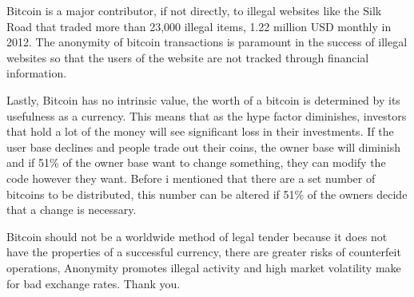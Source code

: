 \documentclass[12pt]{article}
\begin{document}
	Bitcoin is a major contributor, if not directly, to illegal websites like the
	Silk Road that traded more than 23,000 illegal items, 1.22 million USD monthly in
	2012. The anonymity of bitcoin transactions is paramount in the success of
	illegal websites so that the users of the website are not tracked through financial
	information.\autocite{chap12}

	Lastly, Bitcoin has no intrinsic value, the worth of a bitcoin is determined by its
	usefulness as a currency. This means that as the hype factor diminishes, investors
	that hold a lot of the money will see significant loss in their investments. If the
	user base declines and people trade out their coins, the owner base will diminish
	and if 51\% of the owner base  want to change something, they can modify the code
	however they want. Before i mentioned that there are a set number of bitcoins to be
 	distributed, this number can be altered if 51\% of the owners decide that
	a change is necessary.\autocite{chap13}

	Bitcoin should not be a worldwide method of legal tender because it does not have
	the properties of a successful currency, there are greater risks of counterfeit
	operations, Anonymity promotes illegal activity and high market volatility make
	for bad exchange rates. Thank you.

	\clearpage
	\printbibliography
\end{document}
